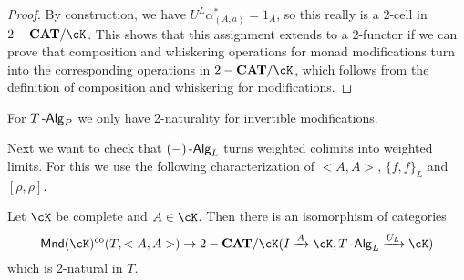 \documentclass[a4paper,11pt,oneside,openany]{scrbook}
\begin{document}
\begin{proof}
    By construction, we have $U^L\alpha^*_{(A,a)}=1_A$, so this really is a
    2-cell in $2-\CAT/\cK$. This shows that this assignment extends to a
    2-functor if we can prove that composition and whiskering operations for
    monad modifications turn into the corresponding operations in $2-\CAT/\cK$,
    which follows from the definition of composition and whiskering for
    modifications.
\end{proof}

\begin{rmk}
    For $T\operatorname{-\mathsf{Alg}}_P$ we only have 2-naturality for invertible modifications.
\end{rmk}

Next we want to check that $(-)\operatorname{-\mathsf{Alg}}_L$ turns weighted colimits into weighted
limits. For this we use the following characterization of $<A,A>$, $\{f,f\}_L$
and $[\rho,\rho]$.

\begin{prop}
    Let $\cK$ be complete and $A\in\cK$. Then there is an isomorphism of
    categories
    \[\Mnd(\cK)^{\text{co}}(T,<A,A>)\rightarrow
    2-\CAT/\cK(I\xrightarrow{A}\cK,T\Alg_L\xrightarrow{U_L}\cK)\]
    which is 2-natural in $T$.
\end{prop}

\backmatter
\end{document}
